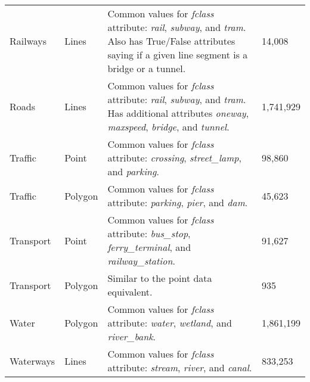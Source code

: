 \begin{longtable}{p{3cm}p{2cm}p{5.7cm}p{2.5cm}}
    Railways           & Lines         & Common values for \emph{fclass} attribute: \emph{rail}, \emph{subway}, and \emph{tram}. Also has True/False attributes saying if a given line segment is a bridge or a tunnel.      & 14,008              \\
    Roads              & Lines         & Common values for \emph{fclass} attribute: \emph{rail}, \emph{subway}, and \emph{tram}. Has additional attributes \emph{oneway}, \emph{maxspeed}, \emph{bridge}, and \emph{tunnel}. & 1,741,929           \\
    Traffic            & Point         & Common values for \emph{fclass} attribute: \emph{crossing}, \emph{street\_lamp}, and \emph{parking}.                                                                                & 98,860              \\
    Traffic            & Polygon       & Common values for \emph{fclass} attribute: \emph{parking}, \emph{pier}, and \emph{dam}.                                                                                             & 45,623              \\
    Transport          & Point         & Common values for \emph{fclass} attribute: \emph{bus\_stop}, \emph{ferry\_terminal}, and \emph{railway\_station}.                                                                   & 91,627              \\
    Transport          & Polygon       & Similar to the point data equivalent.                                                                                                                                               & 935                 \\
    Water              & Polygon       & Common values for \emph{fclass} attribute: \emph{water}, \emph{wetland}, and \emph{river\_bank}.                                                                                    & 1,861,199           \\
    Waterways          & Lines         & Common values for \emph{fclass} attribute: \emph{stream}, \emph{river}, and \emph{canal}.                                                                                           & 833,253             \\
\end{longtable}


\begin{comment}

\end{comment}